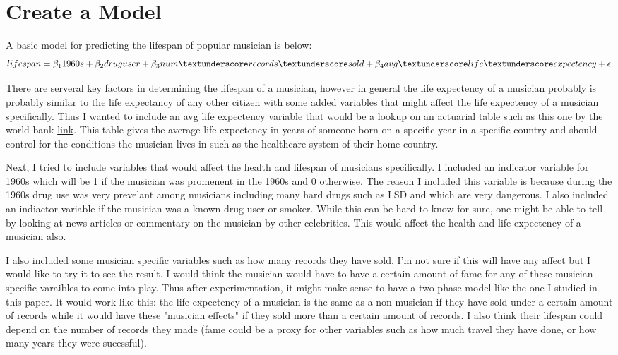 \documentclass{article}
\begin{document}
\clearpage
\section{Create a Model}
A basic model for predicting the lifespan of popular musician is below:
\[ lifespan = \beta_1 1960s + \beta_2 druguser + \beta_3 num\textunderscore records\textunderscore sold + \beta_4 avg\textunderscore life\textunderscore expectency + \epsilon
\]

There are serveral key factors in determining the lifespan of a musician, however in general the life expectency of a musician probably is probably similar to the life expectancy of any other citizen with some added variables that might affect the life expectency of a musician specifically.  Thus I wanted to include an avg life expectency variable that would be a lookup on an actuarial table such as this one by the world bank \href{http://databank.worldbank.org/data/reports.aspx?source=2\&series=SP.DYN.LE00.IN\&country=}{link}.  This table gives the average life expectency in years of someone born on a specific year in a specific country and should control for the conditions the musician lives in such as the healthcare system of their home country.
\vspace{5mm}

Next, I tried to include variables that would affect the health and lifespan of musicians specifically.  I included an indicator variable for 1960s which will be 1 if the musician was promenent in the 1960s and 0 otherwise.  The reason I included this variable is because during the 1960s drug use was very prevelant among musicians including many hard drugs such as LSD and which are very dangerous.  I also included an indiactor variable if the musician was a known drug user or smoker.  While this can be hard to know for sure, one might be able to tell by looking at news articles or commentary on the musician by other celebrities.  This would affect the health and life expectency of a musician also.
\vspace{5mm}

I also included some musician specific variables such as how many records they have sold.  I'm not sure if this will have any affect but I would like to try it to see the result.  I would think the musician would have to have a certain amount of fame for any of these musician specific varaibles to come into play.  Thus after experimentation, it might make sense to have a two-phase model like the one I studied in this paper.  It would work like this: the life expectency of a musician is the same as a non-musician if they have sold under a certain amount of records while it would have these "musician effects" if they sold more than a certain amount of records.  I also think their lifespan could depend on the number of records they made (fame could be a proxy for other variables such as how much travel they have done, or how many years they were sucessful).  
\vspace{5mm}
\end{document}
